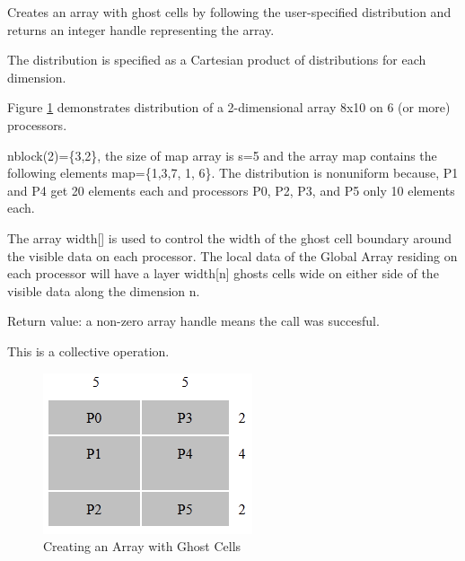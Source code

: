 \documentclass[12pt]{article}
\begin{document}
\begin{desc}

  Creates an array with ghost cells by following the user-specified
  distribution and returns an integer handle representing the array.

  The distribution is specified as a Cartesian product of
  distributions for each dimension. 

Figure \ref{crghostir} demonstrates distribution of a 2-dimensional array 8x10 on 6 (or more) processors. 

nblock(2)=\{3,2\}, the size of map array is s=5 and the array map contains the following elements map=\{1,3,7, 1, 6\}. The distribution is nonuniform because, P1 and P4 get 20 elements each and processors P0, P2, P3, and P5 only 10 elements each.
 
The array width[] is used to control the width of the ghost cell boundary around the visible data on each processor. The local data of the Global Array residing on each processor will have a layer width[n] ghosts cells wide on either side of the visible data along the dimension n. 

Return value: a non-zero array handle means the call was succesful. 

This is a collective operation.

\begin{figure}
\includegraphics{CrGhostIr}
\centering
\caption{Creating an Array with Ghost Cells}
\label{crghostir}
\end{figure}

\end{desc}


\end{document}
